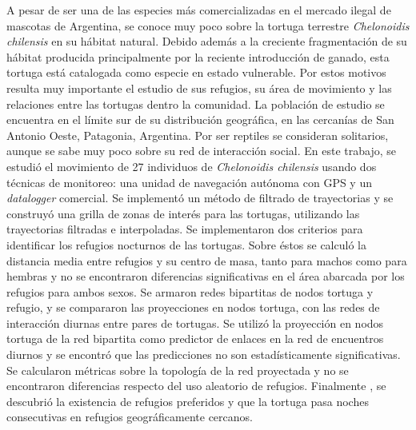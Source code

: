 \begin{resumen}%
    A pesar de ser una de las especies más comercializadas en el mercado ilegal de mascotas de Argentina, se conoce muy poco sobre la tortuga 
    terrestre \textit{Chelonoidis chilensis} en su hábitat natural. Debido 
    además a la creciente fragmentación de su hábitat producida principalmente 
    por la reciente introducción de ganado, esta tortuga está catalogada como 
    especie en estado 
    vulnerable. Por estos motivos resulta muy importante el 
    estudio de sus refugios, su área de movimiento y las relaciones entre 
    las tortugas dentro la comunidad. La población de estudio se encuentra 
    en el límite sur de su distribución geográfica, en las cercanías de
    San Antonio Oeste, Patagonia, Argentina. Por ser reptiles se 
    consideran 
    solitarios, aunque se sabe muy poco sobre su red de interacción social. 
    En este trabajo, se estudió el movimiento de 27 individuos 
    de \textit{Chelonoidis chilensis} usando dos técnicas de monitoreo: 
    una unidad de navegación  autónoma con GPS y un \textit{datalogger} comercial. 
    Se implementó un método de filtrado de trayectorias y se construyó una 
    grilla de zonas de interés para las tortugas, utilizando las 
    trayectorias filtradas e interpoladas. Se implementaron dos criterios 
    para identificar los refugios nocturnos de las tortugas. Sobre éstos 
    se calculó la distancia media entre refugios y su centro de masa, 
    tanto para machos como para hembras y no se 
    encontraron 
    diferencias significativas en el área abarcada por los refugios para 
    ambos sexos. Se armaron redes bipartitas de nodos 
    tortuga y refugio, y se compararon las proyecciones en nodos tortuga, 
    con las redes de interacción diurnas entre pares de tortugas. Se utilizó 
    la proyección en nodos tortuga de 
    la red bipartita como predictor de enlaces en la red de encuentros diurnos
    y se encontró que las predicciones no son estadísticamente significativas. 
    Se calcularon métricas sobre la topología de la red proyectada y no se 
    encontraron diferencias respecto del uso aleatorio de refugios. Finalmente
    , se descubrió la existencia de refugios preferidos y que 
    la tortuga pasa noches consecutivas en refugios geográficamente cercanos.
\end{resumen}

